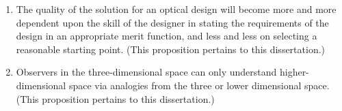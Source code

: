 \documentclass{dissertation}
\begin{document}
\begin{enumerate}

\item The quality of the solution for an optical design will become more and more dependent upon the skill of the designer in stating the requirements of the design in an appropriate merit function, and less and less on selecting a reasonable starting point. 
\small{(This proposition pertains to this dissertation.)}
\normalsize%


\item Observers in the three-dimensional space can only understand higher-dimensional space via analogies from the three or lower dimensional space. 
\small{(This proposition pertains to this dissertation.)}
\normalsize


\end{enumerate}
\end{document}
